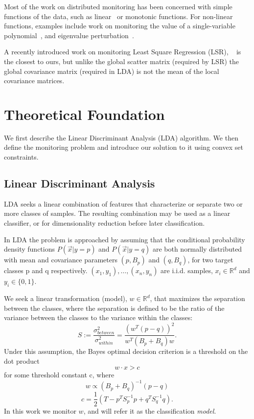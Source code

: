 Most of the work on distributed monitoring has been concerned with simple
functions of the data, such as
linear~\cite{keralapura2006communication, kashyap2008efficient} or
monotonic \cite{michel2005klee} functions.
For non-linear functions, examples include work on monitoring the value
of a single-variable polynomial~\cite{shah2008handling},
and eigenvalue perturbation~\cite{huang2007communication}.

A recently introduced work on monitoring Least Square 
Regression (LSR), ~\cite{gabel2015monitoring} is the closest to ours, 
but unlike the global scatter matrix (required by LSR) the global
covariance matrix (required in LDA) is not the mean of the 
local covariance matrices.


\section{Theoretical Foundation}
We first describe the Linear Discriminant Analysis (LDA) algorithm.
We then define the monitoring problem and introduce our solution to it
using convex set constraints.

\subsection{Linear Discriminant Analysis}%
LDA seeks a linear combination of features that characterize or separate two or more classes of samples.
The resulting combination may be used as a linear classifier, or for dimensionality reduction before later classification.

In LDA the problem is approached by assuming that the conditional probability
density functions $P(\vec x|y=p)$ and $P(\vec x|y=q)$ are both normally distributed with
mean and covariance parameters $(p, B_p)$ and
$(q, B_q)$, for two target classes p and q respectively.
${(x_1,y_1),\ldots,(x_n,y_n)}$ are i.i.d. samples, $x_i \in \mathbb{R}^d$
and $y_i \in \{0,1\}$.

We seek a linear transformation (model), $w \in \mathbb{R}^d $,
that maximizes the separation between the classes, where the separation is
defined to be the ratio of the variance between the classes to the variance
within the classes:
\begin{equation}
S := \frac{\sigma^2_{between}}{\sigma^2_{within}} = \frac{(w^T (p -
q))^2}{w^T(B_p+B_q)w}.
\end{equation}
Under this assumption, the Bayes optimal decision criterion is a threshold on the
dot product
\begin{equation*} \label{eq:decision}
w \cdot x > c
\end{equation*}
for some threshold constant c, where
\begin{equation} \label{eq:w}
w \propto (B_p+B_q)^{-1}(p - q)
\end{equation}
\begin{equation} \label{eq:c}
c = \frac{1}{2}(T-{p}^T S_p^{-1} {p}+{q}^T S_q^{-1} {q}).
\end{equation}
In this work we monitor $w$, and will refer it as the
classification \textit{model}.

